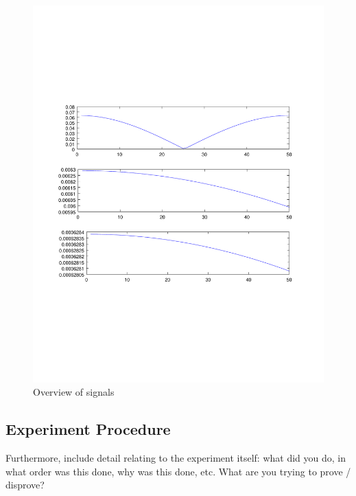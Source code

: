 \begin{figure}
\centering
\includegraphics[scale=0.4]{Figures/absvals}
\caption{Overview of signals}
\label{fig:absvals}
\end{figure}



\subsection{Experiment Procedure}
Furthermore, include detail relating to the experiment itself: what did you do, in what order was this done, why was this done, etc.  What are you trying to prove / disprove?